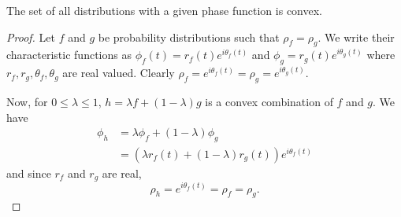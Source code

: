 
\begin{theorem}
	The set of all distributions with a given phase function is convex.
\end{theorem}
\begin{proof}
	Let $f$ and $g$ be probability distributions such that $\rho_f = \rho_g$. We write their characteristic functions as $\phi_f(t) = r_f(t) e^{i \theta_f(t)}$ and $\phi_g = r_g(t) e^{i \theta_g(t)}$ where $r_f,r_g,\theta_f,\theta_g$ are real valued. Clearly $\rho_f = e^{i\theta_f(t)} = \rho_g = e^{i\theta_g(t)}$.
	
	Now, for $0 \leq \lambda \leq 1$, $h = \lambda f + (1-\lambda) g$ is a convex combination of $f$ and $g$. We have
	\begin{align*}
	\phi_h &= \lambda \phi_f + (1-\lambda) \phi_g\\
		&= (\lambda r_f(t) + (1-\lambda) r_g(t)) e^{i \theta_f(t)}
	\end{align*}
	and since $r_f$ and $r_g$ are real,
	$$\rho_h = e^{i \theta_f(t)} = \rho_f = \rho_g.$$
\end{proof}

%

